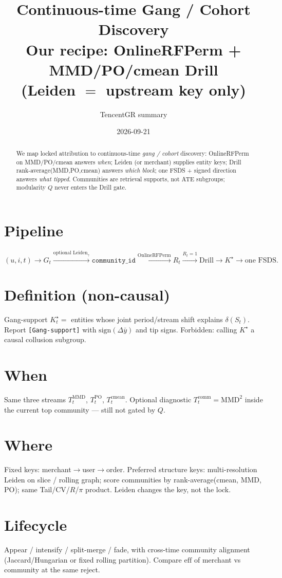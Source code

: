 \documentclass[11pt]{article}
\title{\textbf{Continuous-time Gang / Cohort Discovery}\\
\large Our recipe: OnlineRFPerm + MMD/PO/cmean Drill\\
\large (Leiden $=$ upstream key only)}
\author{TencentGR summary}
\date{2026-09-21}
\begin{document}
\maketitle

\begin{abstract}
We map locked attribution to continuous-time \emph{gang / cohort}
discovery: OnlineRFPerm on MMD/PO/cmean answers \emph{when};
Leiden (or merchant) supplies entity keys; Drill
rank-average(MMD,PO,cmean) answers \emph{which block};
one FSDS + signed direction answers \emph{what tipped}.
Communities are retrieval supports, not ATE subgroups;
modularity $Q$ never enters the Drill gate.
\end{abstract}

\section{Pipeline}
\[
(u,i,t)\to G_t
\xrightarrow{\text{optional Leiden}_\gamma}
\texttt{community\_id}
\xrightarrow{\text{OnlineRFPerm}}
R_t
\xrightarrow{R_t=1}
\text{Drill}\to K^\star
\to\text{one FSDS}.
\]

\section{Definition (non-causal)}
Gang-support $K^\star_t=$ entities whose joint period/stream shift
explains $\delta(S_t)$. Report
\texttt{[Gang-support]} with $\mathrm{sign}(\Delta\bar y)$ and tip signs.
Forbidden: calling $K^\star$ a causal collusion subgroup.

\section{When}
Same three streams $T_t^{\mathrm{MMD}}$, $T_t^{\mathrm{PO}}$,
$T_t^{\mathrm{cmean}}$. Optional diagnostic
$T_t^{\mathrm{comm}}=\mathrm{MMD}^2$ inside the current top community
--- still not gated by $Q$.

\section{Where}
Fixed keys: merchant$\to$user$\to$order.
Preferred structure keys: multi-resolution Leiden on slice / rolling
graph; score communities by rank-average(cmean, MMD, PO); same
Tail/CV/$R$/$\pi$ product. Leiden changes the key, not the lock.

\section{Lifecycle}
Appear / intensify / split-merge / fade, with cross-time community
alignment (Jaccard/Hungarian or fixed rolling partition).
Compare $\mathrm{eff}$ of merchant vs community at the same reject.
\end{document}
